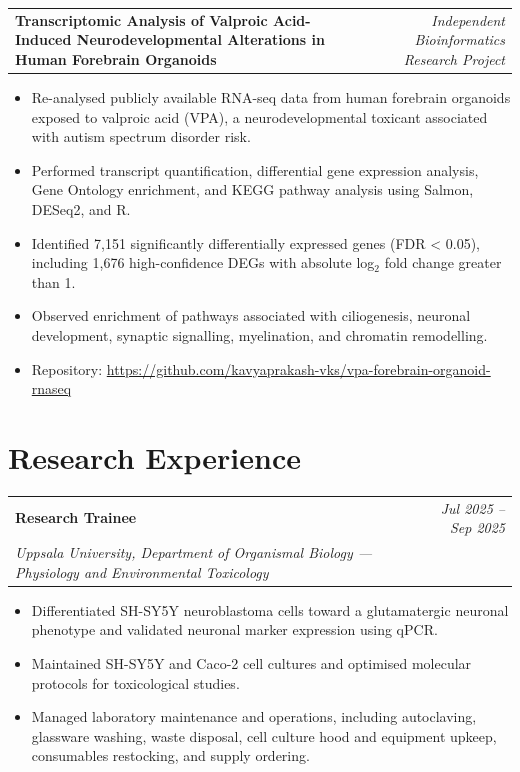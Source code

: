 \documentclass[10pt, a4paper]{article}
\makeatletter
\newcommand{\entry}[3]{%
  \begin{tabularx}{\linewidth}{@{}X r@{}}
    \textbf{#1} & \textit{#3} \\
    \textit{#2} & \\
  \end{tabularx}%
}
\newcommand{\entryflat}[2]{%
  \begin{tabularx}{\linewidth}{@{}X r@{}}
    \textbf{#1} & \textit{#2} \\
  \end{tabularx}%
}
\makeatother
\begin{document}
\entryflat
{Transcriptomic Analysis of Valproic Acid-Induced Neurodevelopmental Alterations in Human Forebrain Organoids}
{Independent Bioinformatics Research Project}

\vspace{3pt}

\begin{itemize}
\item Re-analysed publicly available RNA-seq data from human forebrain organoids exposed to valproic acid (VPA), a neurodevelopmental toxicant associated with autism spectrum disorder risk.
\item Performed transcript quantification, differential gene expression analysis, Gene Ontology enrichment, and KEGG pathway analysis using Salmon, DESeq2, and R.
\item Identified 7,151 significantly differentially expressed genes (FDR < 0.05), including 1,676 high-confidence DEGs with absolute log$_2$ fold change greater than 1.
\item Observed enrichment of pathways associated with ciliogenesis, neuronal development, synaptic signalling, myelination, and chromatin remodelling.
\item Repository: \url{https://github.com/kavyaprakash-vks/vpa-forebrain-organoid-rnaseq}
\end{itemize}


\vspace{2pt}

\section{Research Experience}

\entry{Research Trainee}{Uppsala University, Department of Organismal Biology --- Physiology and Environmental Toxicology}{Jul 2025 -- Sep 2025}
\begin{itemize}
\item Differentiated SH-SY5Y neuroblastoma cells toward a glutamatergic neuronal phenotype and validated neuronal marker expression using qPCR.
\item Maintained SH-SY5Y and Caco-2 cell cultures and optimised molecular protocols for toxicological studies.
\item Managed laboratory maintenance and operations, including autoclaving, glassware washing, waste disposal, cell culture hood and equipment upkeep, consumables restocking, and supply ordering.
\end{itemize}
\end{document}
